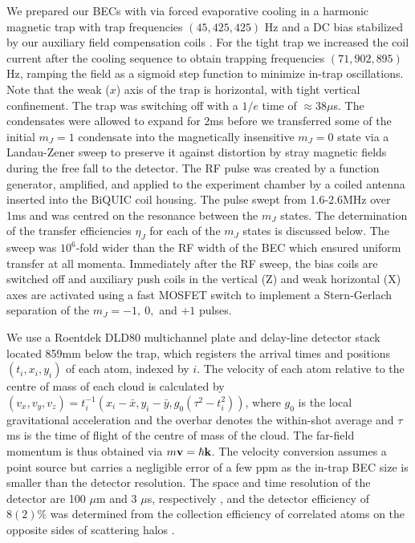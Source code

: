	We prepared our BECs with via forced evaporative cooling in a harmonic magnetic trap with trap frequencies $(45,425,425)$ Hz and a DC bias stabilized by our auxiliary field compensation coils \cite{Dall07,Dedman07}. For the tight trap we increased the coil current after the cooling sequence to obtain trapping frequencies $(71,902,895)$ Hz, ramping the field as a sigmoid step function to minimize in-trap oscillations. Note that the weak ($x$) axis of the trap is horizontal, with tight vertical confinement. The trap was switching off with a $1/e$ time of $\approx38\mu$s. The condensates were allowed to expand for 2ms before we transferred some of the initial $m_J=1$ condensate into the magnetically insensitive $m_J=0$ state via a Landau-Zener sweep to preserve it against distortion by stray magnetic fields during the free fall to the detector. The RF pulse was created by a  function generator, amplified, and applied to the experiment chamber by a coiled antenna inserted into the BiQUIC coil housing. The pulse swept from 1.6-2.6MHz over 1ms and was centred on the resonance between the $m_J$ states. The determination of the transfer efficiencies $\eta_J$ for each of the $m_J$ states is discussed below. The sweep was $10^6$-fold wider than the RF width of the BEC which ensured uniform transfer at all momenta. Immediately after the RF sweep, the bias coils are switched off and auxiliary push coils in the vertical (Z) and weak horizontal (X) axes are activated using a fast MOSFET switch to implement a Stern-Gerlach separation of the $m_J = -1,~0,$ and $+1$ pulses.

	We use a Roentdek DLD80 multichannel plate and delay-line detector stack \cite{Manning10} located 859mm below the trap, which registers the arrival times and positions $(t_i,x_i,y_i)$ of each atom, indexed by $i$. 
	The velocity of each atom relative to the centre of mass of each cloud is calculated by $(v_x,v_y,v_z) = t_{i}^{-1}(x_i-\bar{x},y_i-\bar{y},g_0(\tau^2-t_{i}^{2}))$, where $g_0$ is the local gravitational acceleration and the overbar denotes the within-shot average and $\tau$ ms is the time of flight of the centre of mass of the cloud. 
	The far-field momentum is thus obtained via $m\textbf{v} = \hbar\textbf{k}$.
	The velocity conversion assumes a point source but carries a negligible error of a few ppm as the in-trap BEC size is smaller than the detector resolution. 
	The space and time resolution of the detector are 100 $\mu$m and 3 $\mu$s, respectively \cite{Henson18}, and the detector efficiency of $8(2)\%$ was determined from the collection efficiency of correlated atoms on the opposite sides of scattering halos \cite{shin19,shin20,Jaskula10}. 

